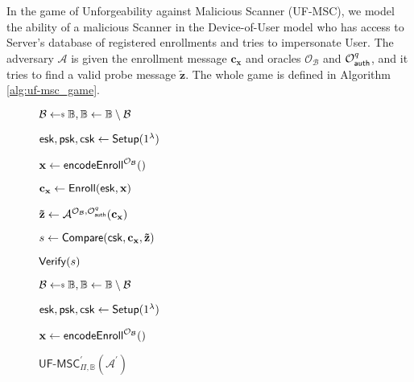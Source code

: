 In the game of Unforgeability against Malicious Scanner ({\sf UF-MSC}), we model the ability of a malicious {\sf Scanner} in the Device-of-User model who has access to {\sf Server}'s database of registered enrollments and tries to impersonate {\sf User}. The adversary $\mathcal{A}$ is given the enrollment message $\mathbf{c_x}$ and oracles $\mathcal{O}_{\mathcal{B}}$ and $\mathcal{O}_{\sf auth}^q$, and it tries to find a valid probe message $\mathbf{\tilde{z}}$. The whole game is defined in Algorithm \ref{alg:uf-msc_game}.


\begin{figure}[h]
\centering

	\begin{minipage}[t]{0.45\linewidth}
	\begin{algorithm}[H]
	\caption{$\textsf{UF-MSC}_{\Pi, \mathbb{B}}(\mathcal{A})$}
	\label{alg:uf-msc_game}
	\begin{algorithmic}[1]
		\State $\mathcal{B} \getsdollar \mathbb{B}, \mathbb{B} \gets \mathbb{B} \setminus \mathcal{B}$

		\State ${\sf esk}, {\sf psk}, {\sf csk} \gets {\sf Setup}(1^\lambda)$

		\State $\mathbf{x} \gets {\sf encodeEnroll}^{\mathcal{O}_{\mathcal{B}}}()$

		\State $\mathbf{c_x} \gets {\sf Enroll}({\sf esk}, \mathbf{x})$

		\State ${\mathbf{\tilde{z}}} \gets \mathcal{A}^{ \mathcal{O}_{\mathcal{B}}, \mathcal{O}_{\sf auth}^q } ( \mathbf{c_x} )$

		\State $s \gets {\sf Compare}( {\sf csk}, \mathbf{c_x}, \mathbf{\tilde{z}} )$

		\State \Return ${\sf Verify}(s)$
	\end{algorithmic}
	\end{algorithm}
	\end{minipage}
	\begin{minipage}[t]{0.45\linewidth}
	\begin{algorithm}[H]
	\caption{$\textsf{UF-MSC}^\prime_{\Pi, \mathbb{B}}(\mathcal{A^\prime})$}
	\label{alg:plain_uf-msc_game}
	\begin{algorithmic}[1]
		\State $\mathcal{B} \getsdollar \mathbb{B}, \mathbb{B} \gets \mathbb{B} \setminus \mathcal{B}$

		\State ${\sf esk}, {\sf psk}, {\sf csk} \gets {\sf Setup}(1^\lambda)$

		\State $\mathbf{x} \gets {\sf encodeEnroll}^{\mathcal{O}_{\mathcal{B}}}()$


\end{algorithmic}
\end{algorithm}
\end{minipage}
\end{figure}
